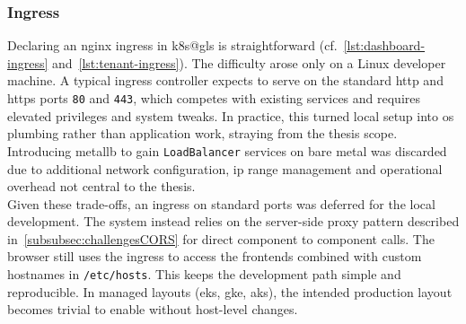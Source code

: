 \documentclass[11pt, a4paper, oneside, listof=totoc]{scrartcl}
\begin{document}
            \subsubsection{Ingress}\label{subsubsec:ingress}
                Declaring an nginx \gls{ingress} in \gls{k8s@gls} is straightforward
                (cf.~\autoref{lst:dashboard-ingress} and~\autoref{lst:tenant-ingress}).
                The difficulty arose only on a Linux developer machine.
                A typical \gls{ingress} controller expects to serve on the standard \gls{http} and
                \gls{https} ports \texttt{80} and \texttt{443}, which competes with existing services
                and requires elevated privileges and system tweaks.
                In practice, this turned local setup into \gls{os} plumbing rather than application
                work, straying from the thesis scope.\\
                Introducing \gls{metallb} to gain \texttt{LoadBalancer} services on bare metal was
                discarded due to additional network configuration, \gls{ip} range management and
                operational overhead not central to the thesis.\\
                Given these trade-offs, an \gls{ingress} on standard ports was deferred for the local
                development.
                The system instead relies on the server-side proxy pattern described
                in~\autoref{subsubsec:challengesCORS} for direct component to component calls.
                The browser still uses the \gls{ingress} to access the frontends combined with custom
                hostnames in \texttt{/etc/hosts}.
                This keeps the development path simple and reproducible.
                In managed layouts (\gls{eks}, \gls{gke}, \gls{aks}), the intended production
                layout becomes trivial to enable without host-level changes.
\end{document}
